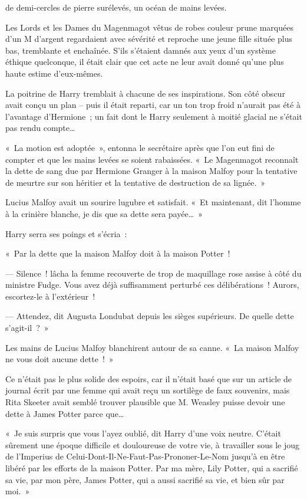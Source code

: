 
 de demi-cercles de pierre surélevés, un océan de mains levées.

\hplettrineextrapara
Les Lords et les Dames du Magenmagot vêtus de robes couleur prune marquées d'un M d'argent regardaient avec sévérité et reproche une jeune fille située plus bas, tremblante et enchaînée. S'ils s'étaient damnés aux yeux d'un système éthique quelconque, il était clair que cet acte ne leur avait donné qu'une plus haute estime d'eux-mêmes.

La poitrine de Harry tremblait à chacune de ses inspirations. Son côté obscur avait conçu un plan -- puis il était reparti, car un ton trop froid n'aurait pas été à l'avantage d'Hermione~; un fait dont le Harry seulement à moitié glacial ne s'était pas rendu compte…

«~La motion est adoptée~», entonna le secrétaire après que l'on eut fini de compter et que les mains levées se soient rabaissées. «~Le Magenmagot reconnaît la dette de sang due par Hermione Granger à la maison Malfoy pour la tentative de meurtre sur son héritier et la tentative de destruction de sa lignée.~»

Lucius Malfoy avait un sourire lugubre et satisfait. «~Et maintenant, dit l'homme à la crinière blanche, je dis que sa dette sera payée…~»

Harry serra ses poings et s'écria~:

«~Par la dette que la maison Malfoy doit à la maison Potter~!

--- Silence~! lâcha la femme recouverte de trop de maquillage rose assise à côté du ministre Fudge. Vous avez déjà suffisamment perturbé ces délibérations~! Aurors, escortez-le à l'extérieur~!

--- Attendez, dit Augusta Londubat depuis les sièges supérieurs. De quelle dette s'agit-il~?~»

Les mains de Lucius Malfoy blanchirent autour de sa canne. «~La maison Malfoy ne vous doit aucune dette~!~»

Ce n'était pas le plus solide des espoirs, car il n'était basé que sur un article de journal écrit par une femme qui avait reçu un sortilège de faux souvenirs, mais Rita Skeeter avait semblé trouver plausible que M. Weasley puisse devoir une dette à James Potter parce que…

«~Je suis surpris que vous l'ayez oublié, dit Harry d'une voix neutre. C'était sûrement une époque difficile et douloureuse de votre vie, à travailler sous le joug de l'Imperius de Celui-Dont-Il-Ne-Faut-Pas-Prononer-Le-Nom jusqu'à en être libéré par les efforts de la maison Potter. Par ma mère, Lily Potter, qui a sacrifié sa vie, par mon père, James Potter, qui a aussi sacrifié sa vie, et bien sûr par moi.~»

